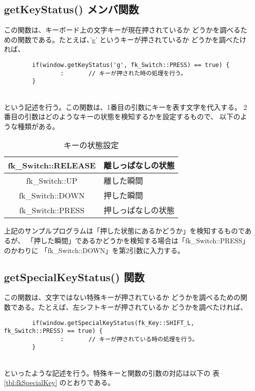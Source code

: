 \subsection{getKeyStatus() メンバ関数}
この関数は、キーボード上の文字キーが現在押されているか
どうかを調べるための関数である。たとえば、'g' というキーが押されているか
どうかを調べたければ、
\\
\begin{screen}
\begin{verbatim}
        if(window.getKeyStatus('g', fk_Switch::PRESS) == true) {
                :       // キーが押された時の処理を行う。
        }
\end{verbatim}
\end{screen}
~ \\
という記述を行う。この関数は、1番目の引数にキーを表す文字を代入する。
2番目の引数はどのようなキーの状態を検知するかを設定するもので、
以下のような種類がある。

\begin{table}[H]
\caption{キーの状態設定}
\label{tbl:fkSwitchStatus}
\begin{center}
\begin{tabular}{|c|l|}
\hline
fk\_Switch::RELEASE & 離しっぱなしの状態 \\ \hline
fk\_Switch::UP & 離した瞬間 \\ \hline
fk\_Switch::DOWN & 押した瞬間 \\ \hline
fk\_Switch::PRESS & 押しっぱなしの状態 \\ \hline
\end{tabular}
\end{center}
\end{table}

上記のサンプルプログラムは「押した状態にあるかどうか」を検知するものであるが、
「押した瞬間」であるかどうかを検知する場合は「fk\_Switch::PRESS」のかわりに
「fk\_Switch::DOWN」を第2引数に入力する。

\subsection{getSpecialKeyStatus() 関数}
この関数は、文字ではない特殊キーが押されているか
どうかを調べるための関数である。たとえば、左シフトキーが押されているか
どうかを調べたければ、
\\
\begin{screen}
\begin{verbatim}
        if(window.getSpecialKeyStatus(fk_Key::SHIFT_L, fk_Switch::PRESS) == true) {
                :       // キーが押されている時の処理を行う。
        }
\end{verbatim}
\end{screen}
~ \\
といったような記述を行う。特殊キーと関数の引数の対応は以下の
表 \ref{tbl:fkSpecialKey} のとおりである。

